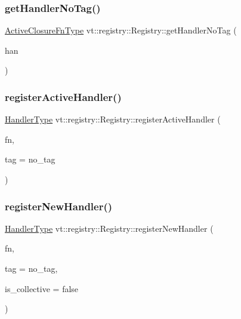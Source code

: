 \subsubsection{\texorpdfstring{get\+Handler\+No\+Tag()}{getHandlerNoTag()}}
{\footnotesize\ttfamily \hyperlink{namespacevt_a2a06c34cafcd511828f16cbf1476b924}{Active\+Closure\+Fn\+Type} vt\+::registry\+::\+Registry\+::get\+Handler\+No\+Tag (\begin{DoxyParamCaption}\item[{\hyperlink{namespacevt_af64846b57dfcaf104da3ef6967917573}{Handler\+Type} const \&}]{han }\end{DoxyParamCaption})}

\mbox{\label{structvt_1_1registry_1_1_registry_ad4fdbf2cfbe4e852c5556435efe4255f}} 
\subsubsection{\texorpdfstring{register\+Active\+Handler()}{registerActiveHandler()}}
{\footnotesize\ttfamily \hyperlink{namespacevt_af64846b57dfcaf104da3ef6967917573}{Handler\+Type} vt\+::registry\+::\+Registry\+::register\+Active\+Handler (\begin{DoxyParamCaption}\item[{\hyperlink{namespacevt_a2a06c34cafcd511828f16cbf1476b924}{Active\+Closure\+Fn\+Type}}]{fn,  }\item[{\hyperlink{namespacevt_a84ab281dae04a52a4b243d6bf62d0e52}{Tag\+Type} const \&}]{tag = {\ttfamily no\+\_\+tag} }\end{DoxyParamCaption})}

\mbox{\label{structvt_1_1registry_1_1_registry_a2e3b140ef858712eb34deb89623cbbc3}} 
\subsubsection{\texorpdfstring{register\+New\+Handler()}{registerNewHandler()}}
{\footnotesize\ttfamily \hyperlink{namespacevt_af64846b57dfcaf104da3ef6967917573}{Handler\+Type} vt\+::registry\+::\+Registry\+::register\+New\+Handler (\begin{DoxyParamCaption}\item[{\hyperlink{namespacevt_a2a06c34cafcd511828f16cbf1476b924}{Active\+Closure\+Fn\+Type}}]{fn,  }\item[{\hyperlink{namespacevt_a84ab281dae04a52a4b243d6bf62d0e52}{Tag\+Type} const \&}]{tag = {\ttfamily no\+\_\+tag},  }\item[{bool const \&}]{is\+\_\+collective = {\ttfamily false} }\end{DoxyParamCaption})}

